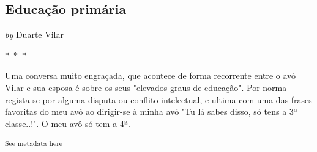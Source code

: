 \documentclass{article}
\begin{document}
\newpage

\begin{center}
\section{Educação primária}
\vspace{0.5cm}

    
        \textit{by} Duarte Vilar
    

\vspace{0.75cm}
 
    
\vspace{0.75cm}
    $\ast$~$\ast$~$\ast$  


    \begin{center}
        \begin{minipage}{0.9\textwidth}
            \setlength{\parskip}{0.2cm}
            \setlength{\parindent}{0cm}
            \fontsize{12pt}{14pt}\selectfont
            


Uma conversa muito engraçada, que acontece de forma recorrente entre o avô Vilar e sua esposa é sobre os seus "elevados graus de educação". Por norma
regista-se por alguma disputa ou conflito intelectual, e ultima com uma
das frases favoritas do meu avô ao dirigir-se à minha avó "Tu lá sabes
disso, só tens a 3ª classe..!". O meu avô só tem a 4ª.

        \end{minipage}
    \end{center}
\end{center}
    
        \textsuperscript{\hyperref[table:\arabic{tablecounter}]{See metadata here}}
    
\end{document}
